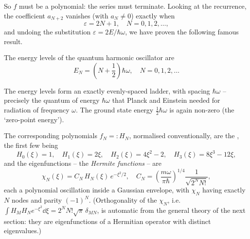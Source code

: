 So $f$ must be a polynomial: the series must terminate. Looking at the recurrence, the coefficient $a_{N+2}$ vanishes (with $a_N \neq 0$) exactly when
$$
\varepsilon = 2N + 1, \quad N = 0, 1, 2, \dots,
$$
and undoing the substitution $\varepsilon = 2E/\hbar\omega$, we have proven the following famous result.

\begin{theorem}
    The energy levels of the quantum harmonic oscillator are
    $$
    E_N = \left( N + \frac{1}{2} \right) \hbar \omega, \quad N = 0, 1, 2, \dots
    $$
\end{theorem}

The energy levels form an exactly evenly-spaced ladder, with spacing $\hbar \omega$ -- precisely the quantum of energy $\hbar\omega$ that Planck and Einstein needed for radiation of frequency $\omega$. The ground state energy $\frac{1}{2}\hbar \omega$ is again non-zero (the `zero-point energy').

The corresponding polynomials $f_N =: H_N$, normalised conventionally, are the , the first few being
$$
H_0(\xi) = 1, \quad H_1(\xi) = 2\xi, \quad H_2(\xi) = 4\xi^2 - 2, \quad H_3(\xi) = 8 \xi^3 - 12 \xi,
$$
and the eigenfunctions -- the \emph{Hermite functions} -- are
$$
\chi_N(\xi) = C_N \, H_N(\xi) \, e^{-\xi^2/2}, \quad C_N = \left(\frac{m\omega}{\pi \hbar}\right)^{1/4}\frac{1}{\sqrt{2^N N!}},
$$
each a polynomial oscillation inside a Gaussian envelope, with $\chi_N$ having exactly $N$ nodes and parity $(-1)^N$. (Orthogonality of the $\chi_N$, i.e.\ $\int H_M H_N e^{-\xi^2} \dd \xi = 2^N N! \sqrt{\pi} \, \delta_{MN}$, is automatic from the general theory of the next section: they are eigenfunctions of a Hermitian operator with distinct eigenvalues.)

